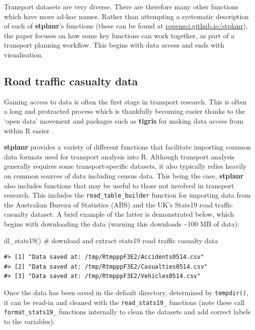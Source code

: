 Transport datasets are very diverse. There are therefore many other
functions which have more ad-hoc names. Rather than attempting a systematic
description of each of \textbf{stplanr}'s functions
(these can be found at \href{https://ropensci.github.io/stplanr/reference/index.html}{ropensci.github.io/stplanr}), the paper focuses on how some key functions can
work together, as part of a transport planning workflow. This begins with data access and ends with visualisation.

\subsection{Road traffic casualty data}\label{accessing-and-processing-transport-data}

Gaining access to data is often the first stage in transport research.
This is often a long and protracted process which is thankfully becoming
easier thanks to the `open data' movement and packages such as
\textbf{tigris} for making data access from within R easier
\citep{walker_tigris:_2016}.

\textbf{stplanr} provides a variety of different functions that
facilitate importing common data formats used for transport analysis
into R. Although transport analysis generally requires some
transport-specific datasets, it also typically relies heavily on common
sources of data including census data. This being the case,
\textbf{stplanr} also includes functions that may be useful to those not
involved in transport research. This includes the
\texttt{read\_table\_builder} function for importing data from the
Australian Bureau of Statistics (ABS) and the UK's Stats19 road traffic
casualty dataset. A brief example of the latter is demonstrated below,
which begins with downloading the data (warning this downloads
\textasciitilde{}100 MB of data):

\begin{Schunk}
\begin{Sinput}
dl_stats19() # download and extract stats19 road traffic casualty data
\end{Sinput}
\end{Schunk}

\begin{verbatim}
#> [1] "Data saved at: /tmp/RtmpppF3E2/Accidents0514.csv"
#> [2] "Data saved at: /tmp/RtmpppF3E2/Casualties0514.csv"
#> [3] "Data saved at: /tmp/RtmpppF3E2/Vehicles0514.csv"
\end{verbatim}

Once the data has been saved in the default directory, determined by
\texttt{tempdir()}, it can be read-in and cleaned with the
\texttt{read\_stats19\_} functions (note these call
\texttt{format\_stats19\_} functions internally to clean the datasets
and add correct labels to the variables):

